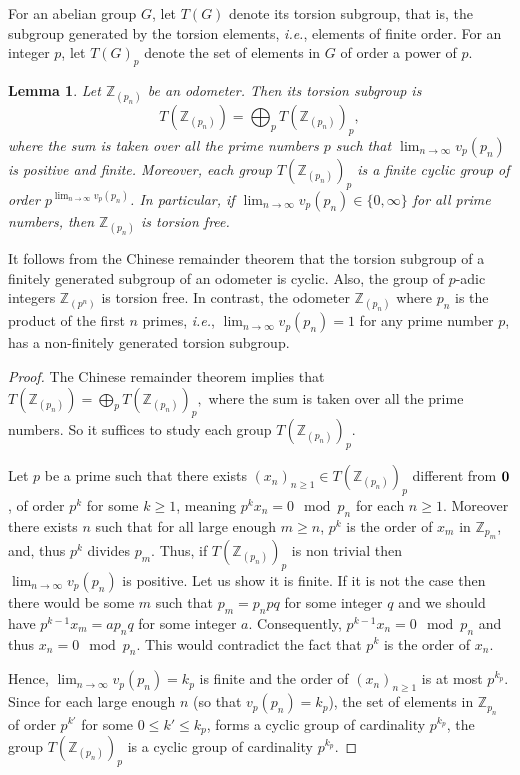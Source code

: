 \documentclass{daj}
\theoremstyle{plain}
\newtheorem{lemma}[theorem]{Lemma}
\theoremstyle{definition}
\begin{document}
For an abelian group $G$, let $T(G)$ denote its torsion subgroup, that is, the subgroup generated by the torsion elements, {\em i.e.}, elements of finite order. 
For an integer $p$, let $T(G)_{p}$ denote the set of elements in $G$ of order a power of $p$. 

\begin{lemma}\label{lem:torsion}
	Let  $\mathbb{Z}_{(p_n)}$  be an odometer. Then its torsion subgroup is 
	$$T({\mathbb{Z}_{(p_n)}}) = \bigoplus_{p} T({\mathbb{Z}_{(p_n)}})_{p},$$
	where the sum is taken over all the prime numbers $p$ such that $\lim_{n\to \infty} v_{p}(p_{n}) $ is positive and finite. Moreover, each group $T({\mathbb{Z}_{(p_n)}})_{p}$ is a finite cyclic group of order  $p^{\lim_{n\to \infty} v_{p}(p_{n})}$.
	In particular, if $\lim_{n \to \infty} v_{p}(p_{n}) \in \{0,  \infty\}$ for all prime numbers, then $\mathbb{Z}_{(p_n)}$ is torsion free.  
\end{lemma}
It follows from the Chinese remainder theorem  that the torsion subgroup of a finitely generated subgroup of an odometer is cyclic. Also, the group of $p$-adic integers $\mathbb{Z}_{(p^n)}$ is torsion free. In contrast, the odometer $\mathbb{Z}_{(p_n)}$ where $p_{n}$ is the product of the first $n$ primes, {\em i.e.}, $\lim_{n\to \infty} v_{p}(p_{n})=1$ for any prime number $p$, has a non-finitely generated torsion subgroup. 
\begin{proof}
	The Chinese remainder theorem implies that $T({\mathbb{Z}_{(p_n)}}) = \bigoplus_{p} T({\mathbb{Z}_{(p_n)}})_{p},$ where the sum is taken over all the prime numbers. So it suffices to study each group $T({\mathbb{Z}_{(p_n)}})_{p}$.
	
	Let $p$ be  a prime such that there exists $(x_{n})_{n\geq 1} \in  T({\mathbb{Z}_{(p_n)}})_{p}$ different from ${\bf 0}$, of order $p^k$ for some $k \ge1 $, meaning $p^k x_{n} = 0 \mod p_{n}$ for each $n \ge 1$. 
	Moreover there exists $n$ such that for all large enough $m\geq n$, $p^k$ is the order of $x_m$ in $\mathbb{Z}_{p_m}$, and, 
	thus $p^k$ divides $p_{m}$.
	Thus, if $T({\mathbb{Z}_{(p_n)}})_{p}$ is non trivial then  $\lim_{n\to \infty} v_{p}(p_{n})$ is positive.
	Let us show it is finite. 
	If it is not the case then there would be some $m$ such that $p_m = p_npq$ for some integer $q$ and we should have $p^{k-1}x_m = ap_nq$ for some integer $a$.
	Consequently, $p^{k-1}x_n = 0 \mod p_{n}$ and thus $x_n = 0  \mod p_{n}$.
	This would contradict the fact that $p^k$ is the order of $x_n$.
	
	Hence, $\lim_{n\to \infty} v_{p}(p_{n}) =k_{p}$ is finite and the order of $(x_n)_{n\geq 1}$ is at most $p^{k_{p}}$. Since for each large enough $n$  (so that $v_{p}(p_{n}) =k_{p}$),  the set of elements in $\mathbb{Z}_{p_{n}}$ of order $p^{k'}$ for some $0 \le k' \le k_{p}$,  forms a cyclic group of cardinality $p^{k_{p}}$, the group $T({\mathbb{Z}_{(p_n)}})_{p}$ is a cyclic group of cardinality $p^{k_{p}}$.
\end{proof}
\end{document}
